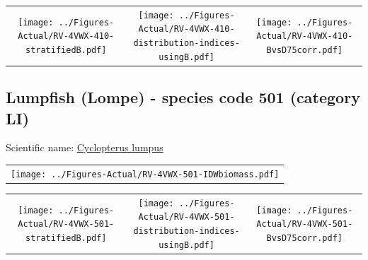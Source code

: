 \documentclass[12pt]{article}\usepackage[]{graphicx}\usepackage[]{color}
\begin{document}
\vspace{1cm}
\begin{minipage}{1.0\textwidth}
 \begin{tabular}{ccc}
\texttt{[image: ../Figures-Actual/RV-4VWX-410-stratifiedB.pdf]} & 
\texttt{[image: ../Figures-Actual/RV-4VWX-410-distribution-indices-usingB.pdf]} & 
\texttt{[image: ../Figures-Actual/RV-4VWX-410-BvsD75corr.pdf]} \\ 
\end{tabular} 
\end{minipage}
\clearpage

\renewcommand\thefigure{\thesubsection\Alph{figure}}

\setcounter{figure}{0}

\hypertarget{sec:501}{%
\subsection{Lumpfish (Lompe) - species code 501 (category LI)}\label{sec:501}}

  


Scientific name: \href{http://www.marinespecies.org/aphia.php?p=taxdetails\&id=127214}{Cyclopterus lumpus} \newline
\begin{minipage}{1.0\textwidth}
 \begin{tabular}{c}
\texttt{[image: ../Figures-Actual/RV-4VWX-501-IDWbiomass.pdf]} \\ 
\end{tabular} 
\end{minipage}
\newline

\vspace{1cm}
\begin{minipage}{1.0\textwidth}
 \begin{tabular}{ccc}
\texttt{[image: ../Figures-Actual/RV-4VWX-501-stratifiedB.pdf]} & 
\texttt{[image: ../Figures-Actual/RV-4VWX-501-distribution-indices-usingB.pdf]} & 
\texttt{[image: ../Figures-Actual/RV-4VWX-501-BvsD75corr.pdf]} \\ 
\end{tabular} 
\end{minipage}
\clearpage
\end{document}
